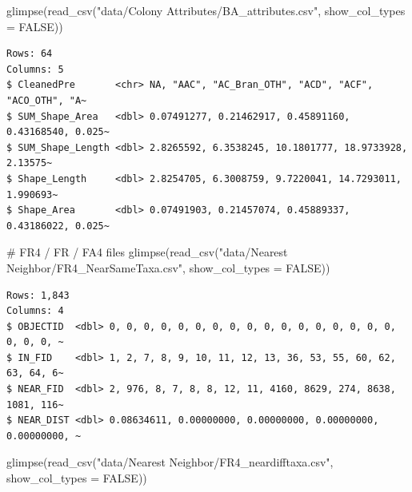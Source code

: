\documentclass[
  letterpaper,
  DIV=11,
  numbers=noendperiod]{scrartcl}
\newenvironment{Shaded}{\begin{snugshade}}{\end{snugshade}}
\newcommand{\AttributeTok}[1]{\textcolor[rgb]{0.40,0.45,0.13}{#1}}
\newcommand{\CommentTok}[1]{\textcolor[rgb]{0.37,0.37,0.37}{#1}}
\newcommand{\ConstantTok}[1]{\textcolor[rgb]{0.56,0.35,0.01}{#1}}
\newcommand{\FunctionTok}[1]{\textcolor[rgb]{0.28,0.35,0.67}{#1}}
\newcommand{\NormalTok}[1]{\textcolor[rgb]{0.00,0.23,0.31}{#1}}
\newcommand{\StringTok}[1]{\textcolor[rgb]{0.13,0.47,0.30}{#1}}
\begin{document}
\begin{Shaded}
\begin{Highlighting}[]
\FunctionTok{glimpse}\NormalTok{(}\FunctionTok{read\_csv}\NormalTok{(}\StringTok{"data/Colony Attributes/BA\_attributes.csv"}\NormalTok{, }\AttributeTok{show\_col\_types =} \ConstantTok{FALSE}\NormalTok{))}
\end{Highlighting}
\end{Shaded}

\begin{verbatim}
Rows: 64
Columns: 5
$ CleanedPre       <chr> NA, "AAC", "AC_Bran_OTH", "ACD", "ACF", "ACO_OTH", "A~
$ SUM_Shape_Area   <dbl> 0.07491277, 0.21462917, 0.45891160, 0.43168540, 0.025~
$ SUM_Shape_Length <dbl> 2.8265592, 6.3538245, 10.1801777, 18.9733928, 2.13575~
$ Shape_Length     <dbl> 2.8254705, 6.3008759, 9.7220041, 14.7293011, 1.990693~
$ Shape_Area       <dbl> 0.07491903, 0.21457074, 0.45889337, 0.43186022, 0.025~
\end{verbatim}

\begin{Shaded}
\begin{Highlighting}[]
\CommentTok{\# FR4 / FR / FA4 files}
\FunctionTok{glimpse}\NormalTok{(}\FunctionTok{read\_csv}\NormalTok{(}\StringTok{"data/Nearest Neighbor/FR4\_NearSameTaxa.csv"}\NormalTok{, }\AttributeTok{show\_col\_types =} \ConstantTok{FALSE}\NormalTok{))}
\end{Highlighting}
\end{Shaded}

\begin{verbatim}
Rows: 1,843
Columns: 4
$ OBJECTID  <dbl> 0, 0, 0, 0, 0, 0, 0, 0, 0, 0, 0, 0, 0, 0, 0, 0, 0, 0, 0, 0, ~
$ IN_FID    <dbl> 1, 2, 7, 8, 9, 10, 11, 12, 13, 36, 53, 55, 60, 62, 63, 64, 6~
$ NEAR_FID  <dbl> 2, 976, 8, 7, 8, 8, 12, 11, 4160, 8629, 274, 8638, 1081, 116~
$ NEAR_DIST <dbl> 0.08634611, 0.00000000, 0.00000000, 0.00000000, 0.00000000, ~
\end{verbatim}

\begin{Shaded}
\begin{Highlighting}[]
\FunctionTok{glimpse}\NormalTok{(}\FunctionTok{read\_csv}\NormalTok{(}\StringTok{"data/Nearest Neighbor/FR4\_neardifftaxa.csv"}\NormalTok{, }\AttributeTok{show\_col\_types =} \ConstantTok{FALSE}\NormalTok{))}
\end{Highlighting}
\end{Shaded}
\end{document}
